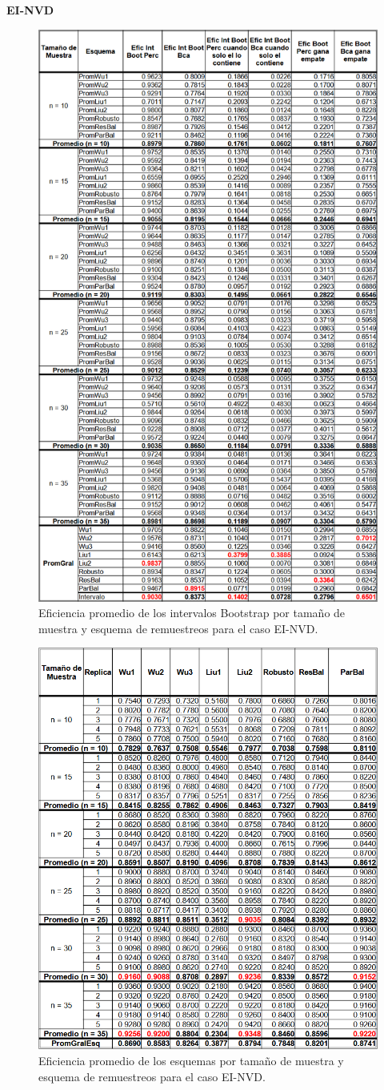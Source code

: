 \textbf{EI-NVD}\\

\begin{figure}[ht] 
	\centering 
	\includegraphics[width=0.55\linewidth]{img/EI_NVD_Efic_Boots.png} 
	\caption{Eficiencia promedio de los intervalos Bootstrap por tamaño de muestra y esquema de remuestreos para el caso EI-NVD.} 
	\label{fig:EficPromIntBootsTamMuestEsqRemuEI-NVD}
\end{figure}
\FloatBarrier


\begin{figure}[ht] 
	\centering 
	\includegraphics[width=0.70\linewidth]{img/EI_NVD_Efic_Esq.png} 
	\caption{Eficiencia promedio de los esquemas por tamaño de muestra y esquema de remuestreos para el caso EI-NVD.} 
	\label{fig:EficPromEsqTamMuesEsqRemuEI-NVD}
\end{figure}
\FloatBarrier




